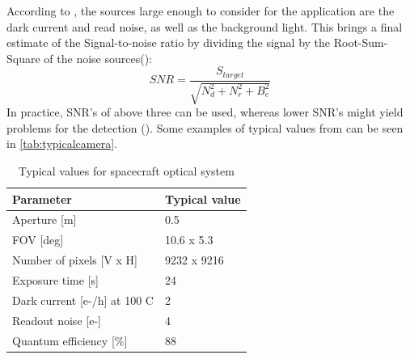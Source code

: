 According to \cite{thesisspacebased}, the sources large enough to consider for the application are the dark current and read noise, as well as the background light. This brings a final estimate of the Signal-to-noise ratio by dividing the signal by the Root-Sum-Square of the noise sources(\cite{OpNav}):
\begin{equation}
    SNR = \frac{S_{target}}{\sqrt{N_d^2 + N_r^2 + B_e^2}}
\end{equation}
In practice, SNR's of above three can be used, whereas lower SNR's might yield problems for the detection (\cite{SMAD}). Some examples of typical values from \cite{NASAreport} can be seen in \autoref{tab:typicalcamera}.

\begin{table}[htbp]
\centering
\caption{Typical values for spacecraft optical system}
\label{tab:typicalcamera}
\begin{tabular}{ll}
\textbf{Parameter}               & \textbf{Typical value} \\ \hline
Aperture {[}m{]}                 & 0.5                    \\
FOV {[}deg{]}                    & 10.6 x 5.3             \\
Number of pixels {[}V x H{]}     & 9232 x 9216            \\
Exposure time {[}s{]}            & 24                     \\
Dark current {[}e-/h{]} at 100 C & 2                      \\
Readout noise {[}e-{]}           & 4                      \\
Quantum efficiency {[}\%{]}      & 88                    
\end{tabular}
\end{table}